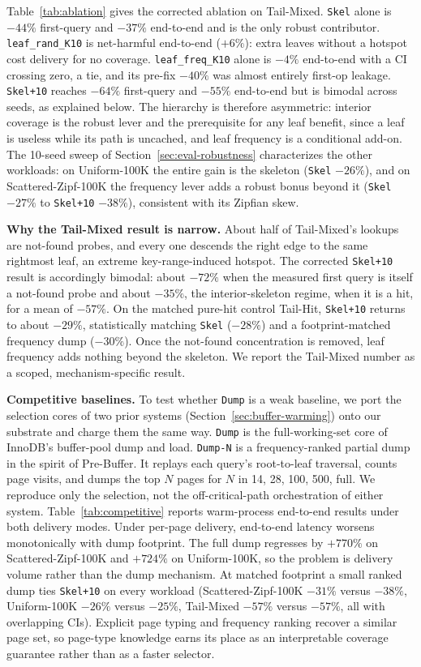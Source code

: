 \documentclass[sigconf, nonacm]{acmart}
\begin{document}
Table~\ref{tab:ablation} gives the corrected ablation on Tail-Mixed. \texttt{Skel} alone is $-44\%$ first-query and $-37\%$ end-to-end and is the only robust contributor. \texttt{leaf\_rand\_K10} is net-harmful end-to-end ($+6\%$): extra leaves without a hotspot cost delivery for no coverage. \texttt{leaf\_freq\_K10} alone is $-4\%$ end-to-end with a CI crossing zero, a tie, and its pre-fix $-40\%$ was almost entirely first-op leakage. \texttt{Skel+10} reaches $-64\%$ first-query and $-55\%$ end-to-end but is bimodal across seeds, as explained below. The hierarchy is therefore asymmetric: interior coverage is the robust lever and the prerequisite for any leaf benefit, since a leaf is useless while its path is uncached, and leaf frequency is a conditional add-on. The 10-seed sweep of Section~\ref{sec:eval-robustness} characterizes the other workloads: on Uniform-100K the entire gain is the skeleton (\texttt{Skel} $-26\%$), and on Scattered-Zipf-100K the frequency lever adds a robust bonus beyond it (\texttt{Skel} $-27\%$ to \texttt{Skel+10} $-38\%$), consistent with its Zipfian skew.

\textbf{Why the Tail-Mixed result is narrow.} About half of Tail-Mixed's lookups are not-found probes, and every one descends the right edge to the same rightmost leaf, an extreme key-range-induced hotspot. The corrected \texttt{Skel+10} result is accordingly bimodal: about $-72\%$ when the measured first query is itself a not-found probe and about $-35\%$, the interior-skeleton regime, when it is a hit, for a mean of $-57\%$. On the matched pure-hit control Tail-Hit, \texttt{Skel+10} returns to about $-29\%$, statistically matching \texttt{Skel} ($-28\%$) and a footprint-matched frequency dump ($-30\%$). Once the not-found concentration is removed, leaf frequency adds nothing beyond the skeleton. We report the Tail-Mixed number as a scoped, mechanism-specific result.

\textbf{Competitive baselines.} To test whether \texttt{Dump} is a weak baseline, we port the
selection cores of two prior systems (Section~\ref{sec:buffer-warming}) onto our substrate and
charge them the same way. \texttt{Dump} is the full-working-set core of InnoDB's buffer-pool
dump and load. \texttt{Dump-N} is a frequency-ranked partial dump in the spirit of Pre-Buffer.
It replays each query's root-to-leaf traversal, counts page visits, and dumps the top $N$ pages
for $N$ in {14, 28, 100, 500, full}. We reproduce only the selection, not the off-critical-path
orchestration of either system. Table~\ref{tab:competitive} reports warm-process end-to-end
results under both delivery modes. Under per-page delivery, end-to-end latency worsens
monotonically with dump footprint. The full dump regresses by $+770\%$ on Scattered-Zipf-100K
and $+724\%$ on Uniform-100K, so the problem is delivery volume rather than the dump mechanism.
At matched footprint a small ranked dump ties \texttt{Skel+10} on every workload
(Scattered-Zipf-100K $-31\%$ versus $-38\%$, Uniform-100K $-26\%$ versus $-25\%$, Tail-Mixed
$-57\%$ versus $-57\%$, all with overlapping CIs). Explicit page typing and frequency ranking
recover a similar page set, so page-type knowledge earns its place as an interpretable coverage
guarantee rather than as a faster selector.
\end{document}
